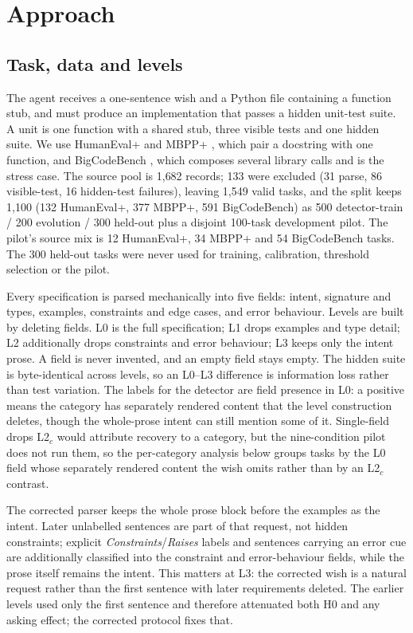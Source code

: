 \documentclass{article}
\begin{document}
\section{Approach}
\label{sec:approach}

\subsection{Task, data and levels}

The agent receives a one-sentence wish and a Python file containing a function stub, and must
produce an implementation that passes a hidden unit-test suite. A unit is one function with a
shared stub, three visible tests and one hidden suite. We use HumanEval+ and MBPP+
\citep{liu2023evalplus}, which pair a docstring with one function, and BigCodeBench
\citep{zhuo2025bigcodebench}, which composes several library calls and is the stress case.
The source pool is 1{,}682 records; 133 were excluded (31 parse, 86 visible-test, 16
hidden-test failures), leaving 1{,}549 valid tasks, and the split keeps 1{,}100 (132
HumanEval+, 377 MBPP+, 591 BigCodeBench) as 500 detector-train / 200 evolution / 300
held-out plus a disjoint 100-task development pilot. The pilot's source mix is 12 HumanEval+, 34 MBPP+ and 54
BigCodeBench tasks. The 300 held-out tasks were never used for training, calibration,
threshold selection or the pilot.

Every specification is parsed mechanically into five fields: intent, signature and types,
examples, constraints and edge cases, and error behaviour. Levels are built by deleting
fields. L0 is the full specification; L1 drops examples and type detail; L2 additionally
drops constraints and error behaviour; L3 keeps only the intent prose. A field is never
invented, and an empty field stays empty. The hidden suite is byte-identical across levels, so
an L0--L3 difference is information loss rather than test variation. The labels for the
detector are field presence in L0: a positive means the category has separately rendered
content that the level construction deletes, though the whole-prose intent can still mention
some of it. Single-field drops L2$_c$ would attribute recovery to a category, but the
nine-condition pilot does not run them, so the per-category analysis below groups tasks by the
L0 field whose separately rendered content the wish omits rather than by an L2$_c$ contrast.

The corrected parser keeps the whole prose block before the examples as the intent. Later
unlabelled sentences are part of that request, not hidden constraints; explicit
\emph{Constraints}/\emph{Raises} labels and sentences carrying an error cue are additionally
classified into the constraint and error-behaviour fields, while the prose itself remains the
intent. This matters at L3: the corrected wish is a natural request rather than the first
sentence with later requirements deleted. The earlier levels used only the first sentence and
therefore attenuated both H0 and any asking effect; the corrected protocol fixes that.
\end{document}
